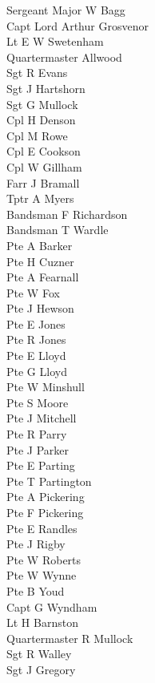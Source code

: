 \begin{multicols}{2}
  \noindent
  Sergeant Major W Bagg \\
  Capt Lord Arthur Grosvenor \\
  Lt E W Swetenham \\
  Quartermaster Allwood \\
  Sgt R Evans \\
  Sgt J Hartshorn \\
  Sgt G Mullock \\
  Cpl H Denson \\
  Cpl M Rowe \\
  Cpl E Cookson \\
  Cpl W Gillham \\
  Farr J Bramall \\
  Tptr A Myers \\
  Bandsman F Richardson \\
  Bandsman T Wardle \\
  Pte A Barker \\
  Pte H Cuzner \\
  Pte A Fearnall \\
  Pte W Fox \\
  Pte J Hewson \\
  Pte E Jones \\
  Pte R Jones \\
  Pte E Lloyd \\
  Pte G Lloyd \\
  Pte W Minshull \\
  Pte S Moore \\
  Pte J Mitchell \\
  Pte R Parry \\
  Pte J Parker \\
  Pte E Parting \\
  Pte T Partington \\
  Pte A Pickering \\
  Pte F Pickering \\
  Pte E Randles \\
  Pte J Rigby \\
  Pte W Roberts \\
  Pte W Wynne \\
  Pte B Youd \\
  Capt G Wyndham \\
  Lt H Barnston \\
  Quartermaster R Mullock \\
  Sgt R Walley \\
  Sgt J Gregory \\

\end{multicols}
